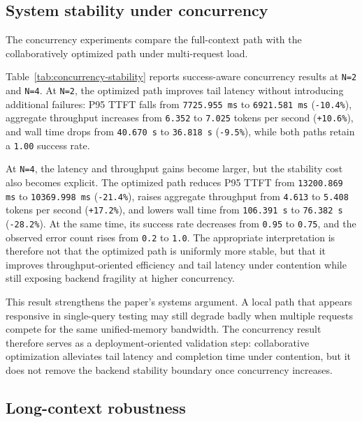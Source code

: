 \documentclass[10pt,twocolumn]{article}
\begin{document}
\subsection{System stability under concurrency}

The concurrency experiments compare the full-context path with the collaboratively optimized path under multi-request load.



Table~\ref{tab:concurrency-stability} reports success-aware concurrency results at \texttt{N=2} and \texttt{N=4}. At \texttt{N=2}, the optimized path improves tail latency without introducing additional failures: P95 TTFT falls from \texttt{7725.955 ms} to \texttt{6921.581 ms} (\texttt{-10.4\%}), aggregate throughput increases from \texttt{6.352} to \texttt{7.025} tokens per second (\texttt{+10.6\%}), and wall time drops from \texttt{40.670 s} to \texttt{36.818 s} (\texttt{-9.5\%}), while both paths retain a \texttt{1.00} success rate.

At \texttt{N=4}, the latency and throughput gains become larger, but the stability cost also becomes explicit. The optimized path reduces P95 TTFT from \texttt{13200.869 ms} to \texttt{10369.998 ms} (\texttt{-21.4\%}), raises aggregate throughput from \texttt{4.613} to \texttt{5.408} tokens per second (\texttt{+17.2\%}), and lowers wall time from \texttt{106.391 s} to \texttt{76.382 s} (\texttt{-28.2\%}). At the same time, its success rate decreases from \texttt{0.95} to \texttt{0.75}, and the observed error count rises from \texttt{0.2} to \texttt{1.0}. The appropriate interpretation is therefore not that the optimized path is uniformly more stable, but that it improves throughput-oriented efficiency and tail latency under contention while still exposing backend fragility at higher concurrency.

This result strengthens the paper's systems argument. A local path that appears responsive in single-query testing may still degrade badly when multiple requests compete for the same unified-memory bandwidth. The concurrency result therefore serves as a deployment-oriented validation step: collaborative optimization alleviates tail latency and completion time under contention, but it does not remove the backend stability boundary once concurrency increases.

\subsection{Long-context robustness}
\end{document}
